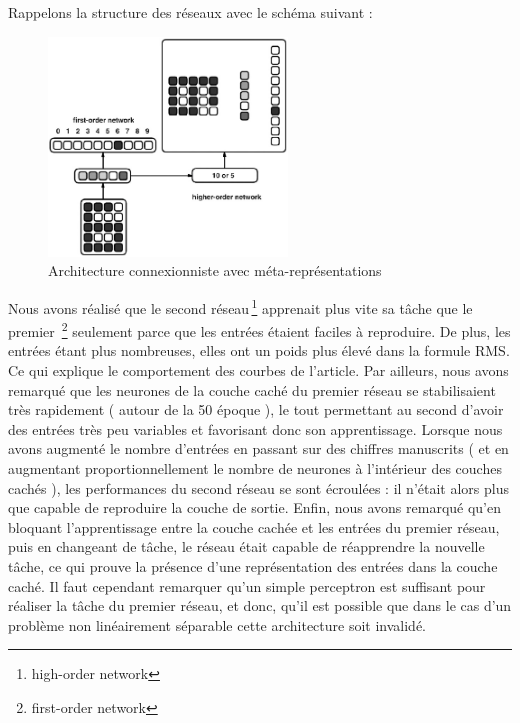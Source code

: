 \documentclass[a4paper,12pt]{article}
\begin{document}
Rappelons la structure des réseaux avec le schéma suivant :
\begin{figure}[h]
\begin{center}
 \includegraphics[width=240px]{../cleeremans_2007/digit_reco/digit_reco.png}
\end{center}
\caption{ \protect \footnotemark[1] Architecture connexionniste avec méta-représentations  }
\end{figure}

Nous avons réalisé que le second réseau\,\footnote{high-order network} apprenait 
plus vite sa tâche que le premier \,\footnote{first-order network}
seulement parce que les entrées étaient faciles à reproduire. De plus, les entrées
étant plus nombreuses, elles ont un poids plus élevé dans la formule RMS. Ce qui 
explique le comportement des courbes de l'article.
\newline
Par ailleurs, nous avons remarqué que les neurones de la couche caché du premier
réseau se stabilisaient très rapidement ( autour de la 50 époque ), le tout
permettant au second d'avoir des entrées très peu variables et favorisant donc son
apprentissage.
\newline
Lorsque nous avons 
augmenté le nombre d'entrées en passant sur des chiffres manuscrits ( et en 
augmentant proportionnellement le nombre de neurones à l'intérieur des couches
cachés ), les performances du second réseau se sont écroulées : il n'était alors
plus que capable de reproduire la couche de sortie.
\newline
Enfin, nous avons remarqué qu'en bloquant l'apprentissage entre la couche cachée et les 
entrées du premier réseau, puis en changeant de tâche, le réseau était capable de réapprendre
la nouvelle tâche, ce qui prouve la présence d'une représentation des entrées dans la couche 
caché.
\newline
\newline
Il faut cependant remarquer qu'un simple perceptron est suffisant pour réaliser la tâche
du premier réseau, et donc, qu'il est possible que dans le cas d'un problème non linéairement
séparable cette architecture soit invalidé.
\end{document}
